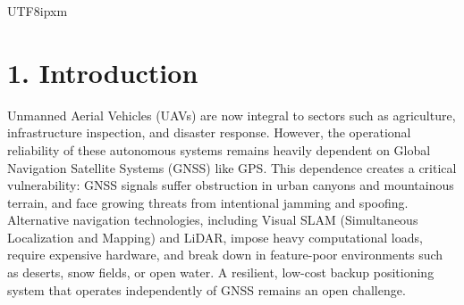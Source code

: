 \documentclass[a4paper,10pt,twocolumn]{article}
\begin{document}
\begin{CJK}{UTF8}{ipxm}


\section*{1. Introduction}

Unmanned Aerial Vehicles (UAVs) are now integral to sectors such as agriculture, infrastructure inspection, and disaster response.
However, the operational reliability of these autonomous systems remains heavily dependent on Global Navigation Satellite Systems (GNSS) like GPS.
This dependence creates a critical vulnerability: GNSS signals suffer obstruction in urban canyons and mountainous terrain, and face growing threats from intentional jamming and spoofing.
Alternative navigation technologies, including Visual SLAM (Simultaneous Localization and Mapping) and LiDAR, impose heavy computational loads, require expensive hardware, and break down in feature-poor environments such as deserts, snow fields, or open water.
A resilient, low-cost backup positioning system that operates independently of GNSS remains an open challenge.


\end{CJK}
\end{document}
